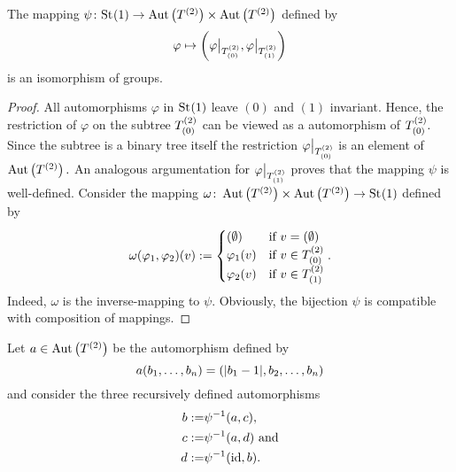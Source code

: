 \begin{lem}\label{thm:Homomorphism psi}
The mapping $\psi\colon\mathrm{St}_{}(1)\to\operatorname{Aut}\left(T^{(2)}\right)\times\operatorname{Aut}\left(T^{(2)}\right)$ defined by
\begin{equation*}
\varphi\mapsto\left(\varphi\big\vert_{T^{(2)}_{(0)}},\varphi\big\vert_{T^{(2)}_{(1)}}\right)
\end{equation*}
is an isomorphism of groups.
\end{lem}
\begin{proof}
All automorphisms $\varphi$ in $\mathrm{St}_{}(1)$ leave $(0)$ and $(1)$ invariant. Hence, the restriction of $\varphi$ on the subtree $T^{(2)}_{(0)}$ can be viewed as a automorphism of $T^{(2)}_{(0)}.$ Since the subtree is a binary tree itself the restriction $\varphi\big\vert_{T^{(2)}_{(0)}}$ is an element of $\operatorname{Aut}\left(T^{(2)}\right).$ An analogous argumentation for $\varphi\big\vert_{T^{(2)}_{(1)}}$ proves that the mapping $\psi$ is well-defined.
Consider the mapping $\omega\colon\operatorname{Aut}\left(T^{(2)}\right)\times\operatorname{Aut}\left(T^{(2)}\right)\to\mathrm{St}_{}(1)$ defined by
\begin{equation*}
\omega(\varphi_1,\varphi_2)(v):=
\begin{cases}
(\emptyset)			& \text{if } v=(\emptyset)\\
\varphi_1(v)	& \text{if } v\in T^{(2)}_{(0)}\\
\varphi_2(v)	& \text{if } v\in T^{(2)}_{(1)}\\
\end{cases}.
\end{equation*}
Indeed, $\omega$ is the inverse-mapping to $\psi.$ Obviously, the bijection $\psi$ is compatible with composition of mappings.
\end{proof}

Let $a\in\operatorname{Aut}\left(T^{(2)}\right)$ be the automorphism defined by
\begin{equation*}
a(b_{1},\ldots,b_{n})=(\lvert b_1-1 \rvert,b_2,\ldots,b_n)
\end{equation*}
and consider the three recursively defined automorphisms
\begin{align*}
b:=&\psi^{-1}(a,c),\\
c:=&\psi^{-1}(a,d) \text{ and}\\
d:=&\psi^{-1}(\operatorname{id},b).
\end{align*}

